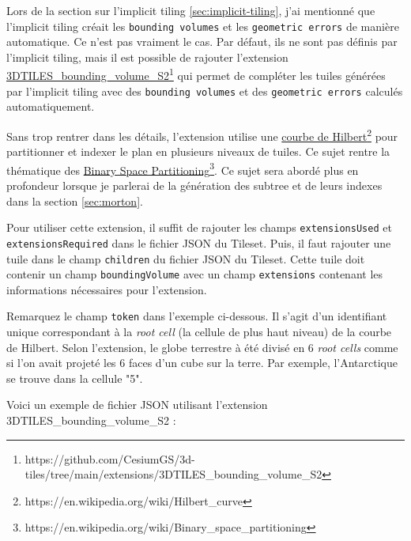 Lors de la section sur l'implicit tiling \autoref{sec:implicit-tiling}, j'ai mentionné que l'implicit tiling créait les \texttt{bounding volumes} et les \texttt{geometric errors} de manière automatique. Ce n'est pas vraiment le cas. Par défaut, ils ne sont pas définis par l'implicit tiling, mais il est possible de rajouter l'extension \href{https://github.com/CesiumGS/3d-tiles/tree/main/extensions/3DTILES_bounding_volume_S2}{3DTILES\_bounding\_volume\_S2}\footnote{https://github.com/CesiumGS/3d-tiles/tree/main/extensions/3DTILES\_bounding\_volume\_S2} qui permet de compléter les tuiles générées par l'implicit tiling avec des \texttt{bounding volumes} et des \texttt{geometric errors} calculés automatiquement.

Sans trop rentrer dans les détails, l'extension utilise une \href{https://en.wikipedia.org/wiki/Hilbert_curve}{courbe de Hilbert}\footnote{https://en.wikipedia.org/wiki/Hilbert\_curve} pour partitionner et indexer le plan en plusieurs niveaux de tuiles. Ce sujet rentre la thématique des \href{https://en.wikipedia.org/wiki/Binary_space_partitioning}{Binary Space Partitioning}\footnote{https://en.wikipedia.org/wiki/Binary\_space\_partitioning}. Ce sujet sera abordé plus en profondeur lorsque je parlerai de la génération des subtree et de leurs indexes dans la section \autoref{sec:morton}.

Pour utiliser cette extension, il suffit de rajouter les champs \texttt{extensionsUsed} et \texttt{extensionsRequired} dans le fichier JSON du Tileset. Puis, il faut rajouter une tuile dans le champ \texttt{children} du fichier JSON du Tileset. Cette tuile doit contenir un champ \texttt{boundingVolume} avec un champ \texttt{extensions} contenant les informations nécessaires pour l'extension.

Remarquez le champ \texttt{token} dans l'exemple ci-dessous. Il s'agit d'un identifiant unique correspondant à la \textit{root cell} (la cellule de plus haut niveau) de la courbe de Hilbert. Selon l'extension, le globe terrestre à été divisé en 6 \textit{root cells} comme si l'on avait projeté les 6 faces d'un cube sur la terre. Par exemple, l'Antarctique se trouve dans la cellule "5".

\newpage

Voici un exemple de fichier JSON utilisant l'extension 3DTILES\_bounding\_volume\_S2 :

